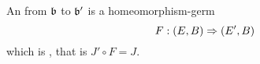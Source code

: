 \begin{mydefinition}
    An  from $\mathfrak{b}$ to $\mathfrak{b}'$ is a homeomorphism-germ 
    \[ F: (E, B) \Rightarrow (E', B) \]
    which is , that is $J' \circ F = J$.
\end{mydefinition}